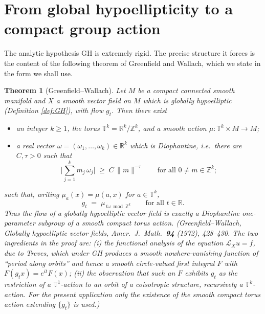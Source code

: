 \documentclass[11pt]{article}
\newtheorem{theorem}{Theorem}[section]
\theoremstyle{definition}
\newcommand{\calL}{\mathcal{L}}
\newcommand{\TT}{\mathbb{T}}
\newcommand{\RR}{\mathbb{R}}
\newcommand{\ZZ}{\mathbb{Z}}
\begin{document}
\section{From global hypoellipticity to a compact group action}
\label{sec:GHtostruct}

The analytic hypothesis GH is extremely rigid. The precise structure it
forces is the content of the following theorem of Greenfield and Wallach,
which we state in the form we shall use.

\begin{theorem}[Greenfield--Wallach]\label{thm:GW}
Let $M$ be a compact connected smooth manifold and $X$ a smooth vector
field on $M$ which is globally hypoelliptic \textup{(}Definition
\ref{def:GH}\textup{)}, with flow $g_t$. Then there exist
\begin{itemize}[leftmargin=2.5em]
  \item an integer $k \ge 1$, the torus $\TT^k = \RR^k / \ZZ^k$, and a
        smooth action $\mu : \TT^k \times M \to M$;
  \item a real vector $\omega = (\omega_1,\dots,\omega_k) \in \RR^k$ which
        is \emph{Diophantine}, i.e.\ there are $C, \tau > 0$ such that
        \[
        \Big|\sum_{j=1}^{k} m_j\,\omega_j\Big|
        \;\ge\; C\,\|m\|^{-\tau}
        \qquad\text{for all } 0 \neq m \in \ZZ^k ;
        \]
\end{itemize}
such that, writing $\mu_a(x) = \mu(a,x)$ for $a \in \TT^k$,
\[
g_t \;=\; \mu_{\,t\omega \bmod \ZZ^k}
\qquad\text{for all } t \in \RR .
\]
Thus the flow of a globally hypoelliptic vector field is exactly a
Diophantine one-parameter subgroup of a smooth compact torus action.
\textup{(}Greenfield--Wallach, \emph{Globally hypoelliptic vector
fields}, Amer.~J.~Math.~\textbf{94} (1972), 428--430. The two ingredients
in the proof are: (i) the functional analysis of the equation
$\calL_X u = f$, due to Treves, which under GH produces a smooth
nowhere-vanishing function of ``period along orbits'' and hence a smooth
circle-valued first integral $F$ with $F(g_t x) = e^{it} F(x)$; (ii) the
observation that such an $F$ exhibits $g_t$ as the restriction of a
$\TT^1$-action to an orbit of a coisotropic structure, recursively a
$\TT^k$-action. For the present application only the \emph{existence of
the smooth compact torus action extending $\{g_t\}$} is
used.\textup{)}
\end{theorem}
\end{document}
